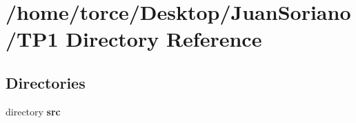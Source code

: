\section{/home/torce/\+Desktop/\+Juan\+Soriano/\+T\+P1 Directory Reference}
\label{dir_12316992d12d45b6562943338383b514}
\subsection*{Directories}
\begin{DoxyCompactItemize}
\item 
directory {\bf src}
\end{DoxyCompactItemize}
